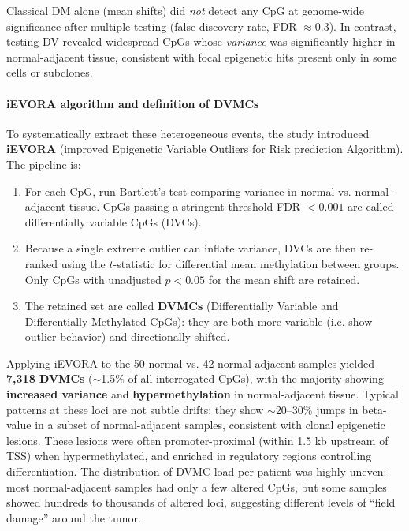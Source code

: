 \documentclass[10pt]{extarticle}
\begin{document}
Classical DM alone (mean shifts) did \textit{not} detect any CpG at genome-wide significance after multiple testing (false discovery rate, FDR $\approx 0.3$). In contrast, testing DV revealed widespread CpGs whose \textit{variance} was significantly higher in normal-adjacent tissue, consistent with focal epigenetic hits present only in some cells or subclones.

\paragraph{iEVORA algorithm and definition of DVMCs}
To systematically extract these heterogeneous events, the study introduced \textbf{iEVORA} (improved Epigenetic Variable Outliers for Risk prediction Algorithm). The pipeline is: 
\begin{enumerate}
  \item For each CpG, run Bartlett’s test comparing variance in normal vs. normal-adjacent tissue. CpGs passing a stringent threshold FDR $< 0.001$ are called differentially variable CpGs (DVCs).
  \item Because a single extreme outlier can inflate variance, DVCs are then re-ranked using the $t$-statistic for differential mean methylation between groups. Only CpGs with unadjusted $p < 0.05$ for the mean shift are retained.
  \item The retained set are called \textbf{DVMCs} (Differentially Variable and Differentially Methylated CpGs): they are both more variable (i.e. show outlier behavior) and directionally shifted.
\end{enumerate}
Applying iEVORA to the 50 normal vs. 42 normal-adjacent samples yielded \textbf{7{,}318 DVMCs} ($\sim$1.5\% of all interrogated CpGs), with the majority showing \textbf{increased variance} and \textbf{hypermethylation} in normal-adjacent tissue. Typical patterns at these loci are not subtle drifts: they show $\sim$20--30\% jumps in beta-value in a subset of normal-adjacent samples, consistent with clonal epigenetic lesions. These lesions were often promoter-proximal (within 1.5 kb upstream of TSS) when hypermethylated, and enriched in regulatory regions controlling differentiation. The distribution of DVMC load per patient was highly uneven: most normal-adjacent samples had only a few altered CpGs, but some samples showed hundreds to thousands of altered loci, suggesting different levels of “field damage” around the tumor.
\end{document}
